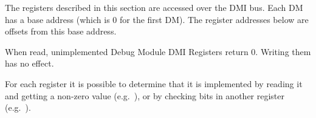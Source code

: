 The registers described in this section are accessed over the DMI bus.  Each DM
has a base address (which is 0 for the first DM). The register addresses below
are offsets from this base address.

When read, unimplemented Debug Module DMI Registers return 0. Writing them has
no effect.

For each register it is possible to determine that it is implemented by reading
it and getting a non-zero value (e.g.\ \RdmSbcs), or by checking bits in another
register (e.g.\ \FdmAbstractcsProgbufsize).



